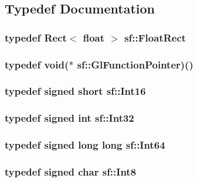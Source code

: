 \subsection{Typedef Documentation}
\hypertarget{namespacesf_ab0d978f5903922a6bdfca1736b71ccc9}{
\subsubsection[{Float\-Rect}]{\setlength{\rightskip}{0pt plus 5cm}typedef {\bf Rect}$<$ float $>$ {\bf sf\-::\-Float\-Rect}}}\label{namespacesf_ab0d978f5903922a6bdfca1736b71ccc9}
\hypertarget{namespacesf_ad4f831952db30b6fd35330c7af581737}{
\subsubsection[{Gl\-Function\-Pointer}]{\setlength{\rightskip}{0pt plus 5cm}typedef void($\ast$ sf\-::\-Gl\-Function\-Pointer)()}}\label{namespacesf_ad4f831952db30b6fd35330c7af581737}
\hypertarget{namespacesf_a3c8e10435e2a310a7741755e66b5c94e}{
\subsubsection[{Int16}]{\setlength{\rightskip}{0pt plus 5cm}typedef signed short {\bf sf\-::\-Int16}}}\label{namespacesf_a3c8e10435e2a310a7741755e66b5c94e}
\hypertarget{namespacesf_ac2dfd4952377a26dee4750e2e4a30a15}{
\subsubsection[{Int32}]{\setlength{\rightskip}{0pt plus 5cm}typedef signed {\bf int} {\bf sf\-::\-Int32}}}\label{namespacesf_ac2dfd4952377a26dee4750e2e4a30a15}
\hypertarget{namespacesf_a2840579fed3494d9f330baf7a5a19903}{
\subsubsection[{Int64}]{\setlength{\rightskip}{0pt plus 5cm}typedef signed long long {\bf sf\-::\-Int64}}}\label{namespacesf_a2840579fed3494d9f330baf7a5a19903}
\hypertarget{namespacesf_a69b109973eac74e22b97e5339bdb68dd}{
\subsubsection[{Int8}]{\setlength{\rightskip}{0pt plus 5cm}typedef signed char {\bf sf\-::\-Int8}}}\label{namespacesf_a69b109973eac74e22b97e5339bdb68dd}
